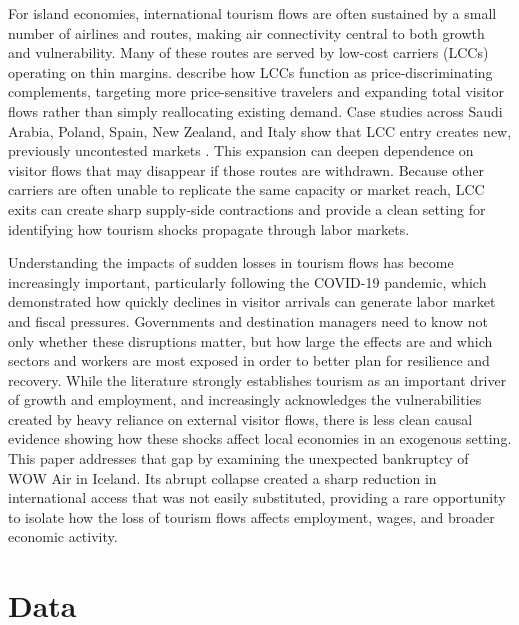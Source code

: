 \documentclass[12pt]{article}
\begin{document}
For island economies, international tourism flows are often sustained by a small number of airlines and routes, making air connectivity central to both growth and vulnerability. Many of these routes are served by low-cost carriers (LCCs) operating on thin margins. \citet{alves_2017_price} describe how LCCs function as price-discriminating complements, targeting more price-sensitive travelers and expanding total visitor flows rather than simply reallocating existing demand. Case studies across Saudi Arabia, Poland, Spain, New Zealand, and Italy show that LCC entry creates new, previously uncontested markets \citep{alsumairi_2017_a, pulina_2010_have, rey_2011_effect, hongtsui_2017_does, verarebollo_2009_spread}. This expansion can deepen dependence on visitor flows that may disappear if those routes are withdrawn. Because other carriers are often unable to replicate the same capacity or market reach, LCC exits can create sharp supply-side contractions and provide a clean setting for identifying how tourism shocks propagate through labor markets.

Understanding the impacts of sudden losses in tourism flows has become increasingly important, particularly following the COVID-19 pandemic, which demonstrated how quickly declines in visitor arrivals can generate labor market and fiscal pressures. Governments and destination managers need to know not only whether these disruptions matter, but how large the effects are and which sectors and workers are most exposed in order to better plan for resilience and recovery. While the literature strongly establishes tourism as an important driver of growth and employment, and increasingly acknowledges the vulnerabilities created by heavy reliance on external visitor flows, there is less clean causal evidence showing how these shocks affect local economies in an exogenous setting. This paper addresses that gap by examining the unexpected bankruptcy of WOW Air in Iceland. Its abrupt collapse created a sharp reduction in international access that was not easily substituted, providing a rare opportunity to isolate how the loss of tourism flows affects employment, wages, and broader economic activity.

\section{Data}\label{sec:data}
\end{document}
